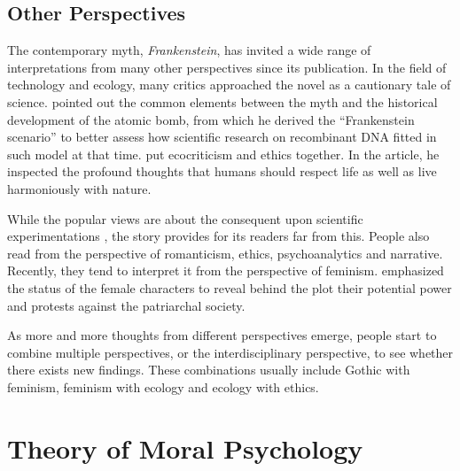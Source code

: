 \subsection{Other Perspectives} %
\label{sub:other_perspectives}
\begin{text}

The contemporary myth, \textit{Frankenstein}, has invited a wide range of interpretations from many other perspectives since its publication. In the field of technology and ecology, many critics approached the novel as a cautionary tale of science. \citet{isaacs1986creation} pointed out the common elements between the myth and the historical development of the atomic bomb, from which he derived the ``Frankenstein scenario'' to better assess how scientific research on recombinant DNA fitted in such model at that time.  put ecocriticism and ethics together. In the article, he inspected the profound thoughts that humans should respect life as well as live harmoniously with nature.

While the popular views are about the consequent upon scientific experimentations \citep{davies2004can}, the story provides for its readers far from this. People also read from the perspective of romanticism, ethics, psychoanalytics and narrative. Recently, they tend to interpret it from the perspective of feminism.  emphasized the status of the female characters to reveal behind the plot their potential power and protests against the patriarchal society.

As more and more thoughts from different perspectives emerge, people start to combine multiple perspectives, or the interdisciplinary perspective, to see whether there exists new findings. These combinations usually include Gothic with feminism, feminism with ecology and ecology with ethics.

\end{text}
\section{Theory of Moral Psychology} %
\label{sec:theory_of_moral_psychology}
\secspacesubsec
